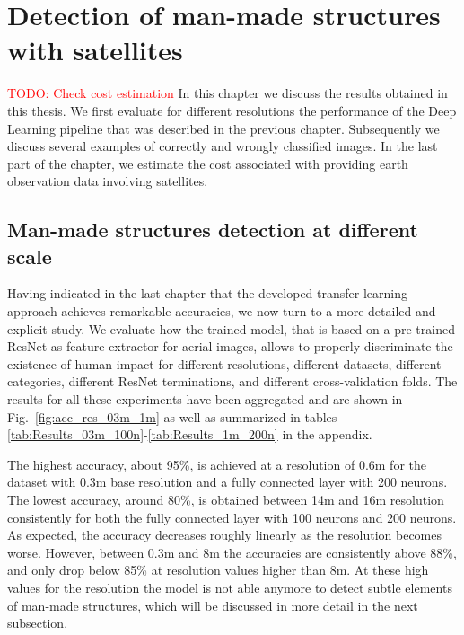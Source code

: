 
\chapter{Detection of man-made structures with satellites} 

\label{Chapter5}


\textcolor{red}{TODO: Check cost estimation}
In this chapter we discuss the results obtained in this thesis. We first evaluate for different resolutions the performance of the Deep Learning pipeline that was described in the previous chapter. Subsequently we discuss several examples of correctly and wrongly classified images. In the last part of the chapter, we estimate the cost associated with providing earth observation data involving satellites.

\section{Man-made structures detection at different scale}

Having indicated in the last chapter that the developed transfer learning approach achieves remarkable accuracies, we now turn to a more detailed and explicit study. We evaluate how the trained model, that is based on a pre-trained ResNet as feature extractor for aerial images, allows to properly discriminate the existence of human impact for different resolutions, different datasets, different categories, different ResNet terminations, and different cross-validation folds. The results for all these experiments have been aggregated and are shown in Fig.~\ref{fig:acc_res_03m_1m} as well as summarized in tables \ref{tab:Results_03m_100n}-\ref{tab:Results_1m_200n} in the appendix. 

The highest accuracy, about 95\%, is achieved at a resolution of 0.6m for the dataset with 0.3m base resolution and a fully connected layer with 200 neurons. The lowest accuracy, around 80\%, is obtained between 14m and 16m resolution consistently for both the fully connected layer with 100 neurons and 200 neurons. As expected, the accuracy decreases roughly linearly as the resolution becomes worse. However, between 0.3m and 8m the accuracies are consistently above 88\%, and only drop below 85\% at resolution values higher than 8m. At these high values for the resolution the model is not able anymore to detect subtle elements of man-made structures, which will be discussed in more detail in the next subsection.

